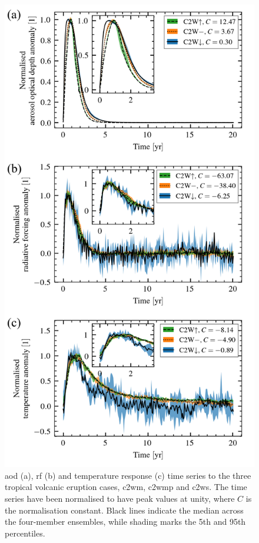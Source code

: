 \documentclass{ametsocV6.1}
\begin{document}
\begin{figure}
  \centering
  \includegraphics{figures/figure1.png}

  \caption{\gls{aod} (a), \gls{rf} (b) and temperature response (c) time series to the
    three tropical volcanic eruption cases, \gls{c2wm}, \gls{c2wmp} and \gls{c2ws}. The time
    series have been normalised to have peak values at unity, where \(C\) is the
    normalisation constant. Black lines indicate the median across the four-member
    ensembles, while shading marks the 5th and 95th
    percentiles.}\label{fig:compare-waveform-temp}%
\end{figure}
\end{document}
